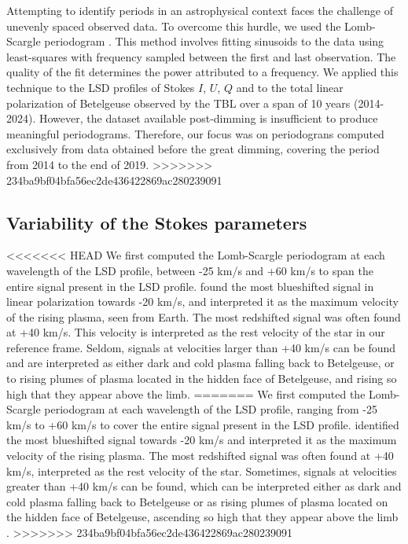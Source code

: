 \documentclass{aa}
\begin{document}
Attempting to identify periods in an astrophysical context faces the challenge of unevenly spaced observed data. To overcome this hurdle, 
we used the Lomb-Scargle periodogram \citep{lomb_least-squares_1976,scargle_studies_1982}. This method involves fitting sinusoids to the data using least-squares with frequency sampled between the first and last observation. The quality of the fit determines the power attributed to a frequency. We applied this technique to the  LSD profiles of Stokes $I$, $U$, $Q$ and to the total linear polarization of Betelgeuse observed by the TBL over a span of 10 years (2014-2024). However, the dataset available post-dimming is insufficient to produce meaningful periodograms. Therefore, our focus was on periodograns computed exclusively from data obtained before the great dimming, covering the period from 2014 to the end of 2019. 
>>>>>>> 234ba9bf04bfa56ec2de436422869ac280239091

\subsection{Variability of the Stokes parameters}

<<<<<<< HEAD
We first computed the Lomb-Scargle periodogram at each wavelength of the LSD profile, between -25 km/s and +60 km/s to span the entire 
signal present in the LSD profile. \cite{lopez_ariste_convective_2018} found the most blueshifted signal in linear polarization  towards -20 km/s, 
and interpreted it as  the maximum velocity of the rising plasma, seen from  Earth. The most redshifted signal was often found at +40 km/s. 
This velocity is interpreted
as the rest velocity of the star in our reference frame. Seldom, signals at velocities larger than +40 km/s can be found 
and are interpreted as either dark and cold plasma falling back to Betelgeuse, 
or to rising plumes of plasma located in the hidden face of Betelgeuse,
and rising so high that they appear above the limb.
=======
We first computed the Lomb-Scargle periodogram at each wavelength of the LSD profile, ranging from -25 km/s to +60 km/s to cover the entire 
signal present in the LSD profile. \cite{lopez_ariste_convective_2018} identified the most blueshifted signal towards -20 km/s and interpreted it as  the maximum velocity of the rising plasma. The most redshifted signal was often found at +40 km/s, interpreted 
as the rest velocity of the star. Sometimes, signals at velocities greater than +40 km/s can be found, which can be interpreted either as dark and cold plasma falling back to Betelgeuse or as rising plumes of plasma located on the hidden face of Betelgeuse, ascending so high that they appear above the limb \citep[for the case of the RSG $\mu$Cep]{lopez_ariste_height_2023}.
>>>>>>> 234ba9bf04bfa56ec2de436422869ac280239091
\end{document}
